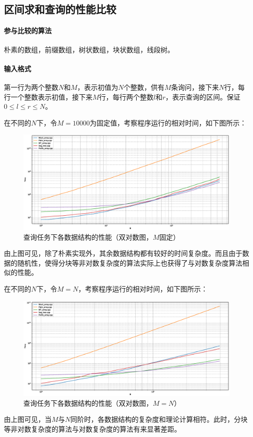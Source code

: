 \documentclass{cjc}
\begin{document}
\subsection{区间求和查询的性能比较}

\paragraph{参与比较的算法}朴素的数组，前缀数组，树状数组，块状数组，线段树。
\paragraph{输入格式} 第一行为两个整数$N$和$M$，表示初值为$N$个整数，供有$M$条询问，接下来$N$行，每行一个整数表示初值，接下来$M$行，每行两个整数$l$和$r$，表示查询的区间。保证$0\leq l \leq r \leq N$。

在不同的$N$下，令$M=10000$为固定值，考察程序运行的相对时间，如下图所示：
\begin{figure}[H]
  \centering
  \includegraphics[width=\linewidth]{images/performance1.eps}
  \caption{查询任务下各数据结构的性能（双对数图，$M$固定）}
\end{figure}
由上图可见，除了朴素实现外，其余数据结构都有较好的时间复杂度。而且由于数据的随机性，使得分块等非对数复杂度的算法实际上也获得了与对数复杂度算法相似的性能。

在不同的$N$下，令$M=N$，考察程序运行的相对时间，如下图所示：
\begin{figure}[H]
  \centering
  \includegraphics[width=\linewidth]{images/performance2.eps}
  \caption{查询任务下各数据结构的性能（双对数图，$M=N$）}
\end{figure}
由上图可见，当$M$与$N$同阶时，各数据结构的复杂度和理论计算相符。此时，分块等非对数复杂度的算法与对数复杂度的算法有来显著差距。
\end{document}
